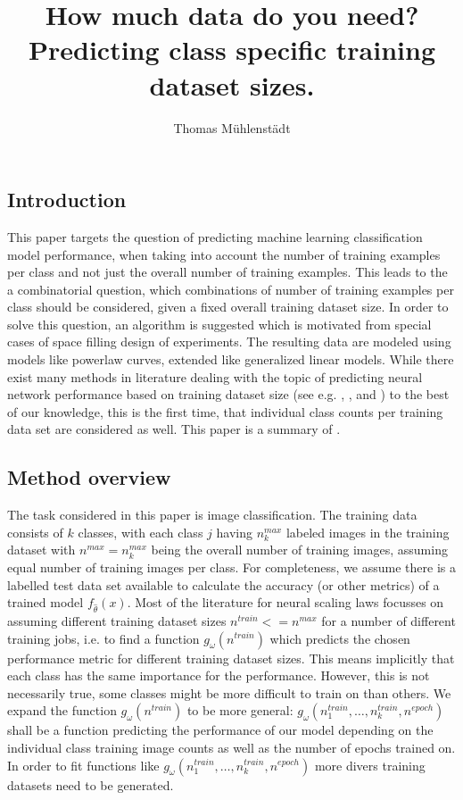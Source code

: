 \documentclass{article} %
\title{\vspace{-2cm}How much data do you need? Predicting class specific training dataset sizes.}
\author{Thomas Mühlenstädt}
\date{\vspace{-5ex}}
\begin{document}
\maketitle


\subsection*{Introduction}

This paper targets the question of predicting machine learning classification model performance, when taking into account the number of training examples per class and not just the overall number of training examples.
This leads to the a combinatorial question, which combinations of number of training examples per class should be considered, given a fixed overall training dataset size. 
In order to solve this question, an algorithm is suggested which is motivated from special cases of space filling design of experiments.
The resulting data are modeled using models like powerlaw curves, extended like generalized linear models. While there exist many methods 
in literature dealing with the topic of predicting neural network performance based on training dataset size (see e.g. \cite{hestness2017deep}, \cite{cho2016data}, 
\cite{hoffmann2022training} and \cite{alabdulmohsin2022revisiting}) to the best of our knowledge, this is the first time, that individual class counts per training data set are considered as well. 
This paper is a summary of \cite{muehlenstaedt2024data}.

\subsection*{Method overview}

The task considered in this paper is image classification.
The training data consists of $k$ classes, with each class $j$ having $n_k^{max}$ labeled images in the training dataset with $n^{max} = n_k^{max}$ being the overall 
number of training images, assuming equal number of training images per class.
For completeness, we assume there is a labelled test data set available to calculate the accuracy (or other metrics) of a trained model $f_{\hat{\theta}}(x)$.
Most of the literature for neural scaling laws focusses on assuming different training dataset sizes $n^{train} <= n^{max}$ for a number of different training jobs, i.e. to find a function $g_{\omega}(n^{train})$ which predicts the chosen performance metric for different training dataset sizes.
This means implicitly that each class has the same importance for the performance.
However, this is not necessarily true, some classes might be more difficult to train on than others.
We expand the function $g_{\omega}(n^{train})$ to be more general:  $g_{\omega}(n_1^{train}, \dots, n_k^{train}, n^{epoch})$ shall be a function predicting the performance of our model depending on the individual class training image counts as well as the number of epochs trained on.
In order to fit functions like $g_{\omega}(n_1^{train}, \dots, n_k^{train}, n^{epoch})$ more divers training datasets need to be generated.
\end{document}
